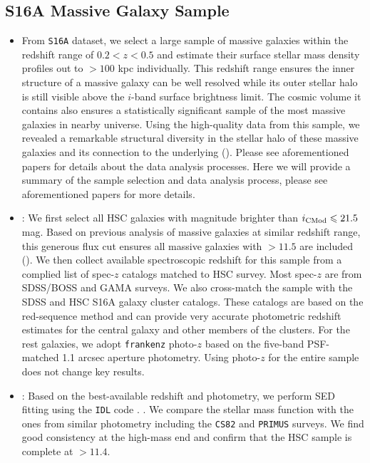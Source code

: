 \documentclass[fleqn,usenatbib,useAMS,english]{mnras}
\begin{document}
\subsection{S16A Massive Galaxy Sample}
    \label{sec:sample}

	\begin{itemize}

		\item From \texttt{S16A} dataset, we select a large sample of massive galaxies
			within the redshift range of $0.2 < z < 0.5$ and estimate their surface
			stellar mass density profiles out to $>100$ kpc individually.
			This redshift range ensures the inner structure of a massive galaxy can be
			well resolved while its outer stellar halo is still visible above the $i$-band
			surface brightness limit.
			The cosmic volume it contains also ensures a statistically significant sample
			of the most massive galaxies in nearby universe.
			Using the high-quality data from this sample, we revealed a remarkable structural
			diversity in the stellar halo of these massive galaxies and its connection to
			the underlying \mhalo{} (\addref{}).
			Please see aforementioned papers for details about the data analysis processes.
			Here we will provide a summary of the sample selection and data analysis
			process, please see aforementioned papers for more details.

		\item {}: We first select all HSC galaxies with \cmodel{} magnitude
			brighter than $i_{\rm CMod} \leq 21.5$ mag. Based on previous analysis of massive
			galaxies at similar redshift range, this generous flux cut ensures all massive
			galaxies with \mstar{}$>11.5$ are included (\addref{}).
			We then collect available spectroscopic redshift for this sample from a complied
			list of spec-$z$ catalogs matched to HSC survey.
			Most spec-$z$ are from SDSS/BOSS and GAMA surveys.
			We also cross-match the sample with the SDSS \redm{} and HSC S16A \camira{}
			galaxy cluster catalogs.
			These catalogs are based on the red-sequence method and can provide very accurate
			photometric redshift estimates for the central galaxy and other members of the
			clusters.
            For the rest galaxies, we adopt \texttt{frankenz} photo-$z$ based on the five-band
            PSF-matched 1.1 arcsec aperture photometry.
            Using photo-$z$ for the entire sample does not change key results.

		\item {}: Based on the best-available redshift and \cmodel{} photometry,
			we perform SED fitting using the \texttt{IDL} code \ised{}.
			.
			We compare the \mcmodel{} stellar mass function with the ones from similar
			photometry including the \texttt{CS82} and \texttt{PRIMUS} surveys.
			We find good consistency at the high-mass end and confirm that the HSC
			sample is complete at \mcmodel{}$>11.4$.

	\end{itemize}
\end{document}
